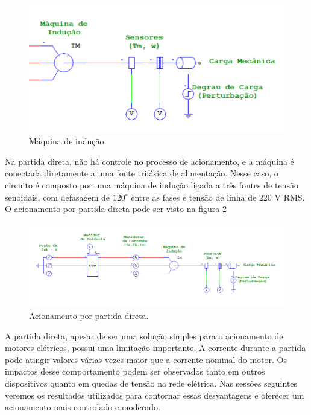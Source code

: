 \documentclass[a4paper, 11pt]{article}
\begin{document}
\begin{figure}[H]
    \centering
        \includegraphics[width=1\linewidth]{images/máquina de indução (circuito).png}
    \caption{Máquina de indução.}
    \label{máquina de indução}
\end{figure}

Na partida direta, não há controle no processo de acionamento, e a máquina é conectada diretamente a uma fonte trifásica de alimentação. Nesse caso, o circuito é composto por uma máquina de indução ligada a três fontes de tensão senoidais, com defasagem de $120^\circ$ entre as fases e tensão de linha de 220 V RMS. O acionamento por partida direta pode ser visto na figura \ref{partida direta}

\begin{figure}[H]
    \centering
        \includegraphics[width=1\linewidth]{images/partida direta circuito.png}
    \caption{Acionamento por partida direta.}
    \label{partida direta}
\end{figure}

A partida direta, apesar de ser uma solução simples para o acionamento de motores elétricos, possui uma limitação importante. A corrente durante a partida pode atingir valores várias vezes maior que a corrente nominal do motor. Os impactos desse comportamento podem ser observados tanto em outros dispositivos quanto em quedas de tensão na rede elétrica. Nas sessões seguintes veremos os resultados utilizados para contornar essas desvantagens e oferecer um acionamento mais controlado e moderado. 
\end{document}

